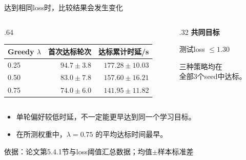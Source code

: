 \documentclass[aspectratio=169,11pt]{beamer}
\newcommand{\key}[1]{{\color{Teal}\bfseries #1}}
\newcommand{\src}[1]{\vfill{\color{Gray}\fontsize{7.5}{9}\selectfont 依据：#1\par}}
\newcommand{\tight}{\setlength{\itemsep}{.18cm}}
\begin{document}
\begin{frame}{达到相同loss时，比较结果会发生变化}
\begin{columns}[T,onlytextwidth]
\begin{column}{.64\textwidth}
\renewcommand{\arraystretch}{1.65}
\begin{tabular}{@{}lrr@{}}
\toprule
\textbf{Greedy $\lambda$} & \textbf{首次达标轮次} & \textbf{达标累计时延/s}\\
\midrule
0.25 & $94.7\pm3.8$ & $177.28\pm10.03$\\
0.50 & $83.0\pm7.8$ & $157.60\pm16.21$\\
0.75 & $74.0\pm6.0$ & $141.95\pm11.82$\\
\bottomrule
\end{tabular}\par
\end{column}
\begin{column}{.32\textwidth}
\key{共同目标}\par
测试loss $\leq1.30$\par\vspace{.3cm}
三种策略均在\\全部3个seed中达标。
\end{column}
\end{columns}
\par\vspace{.35cm}
\begin{itemize}\tight
\item 单轮偏好较低时延，不一定能更早达到同一个学习目标。
\item 在所测权重中，$\lambda=0.75$ 的平均达标时间最早。
\end{itemize}
\src{论文第5.4.1节与loss阈值汇总数据；均值$\pm$样本标准差}
\end{frame}
\end{document}
